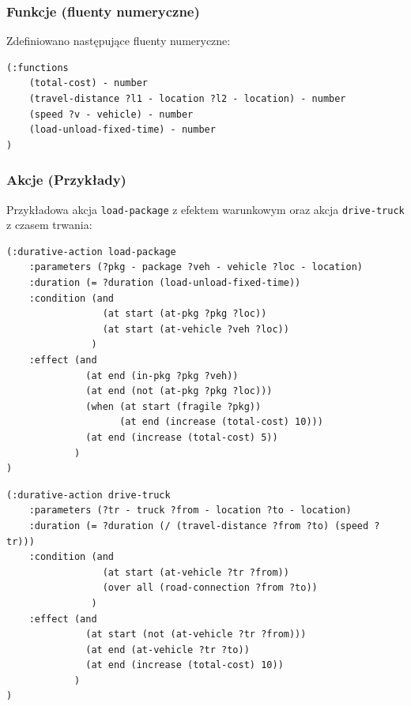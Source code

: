 \documentclass[11pt,a4paper]{article}
\begin{document}
\subsubsection{Funkcje (fluenty numeryczne)}
Zdefiniowano następujące fluenty numeryczne:
\begin{lstlisting}[caption=Funkcje w domenie Zadania 1, label=lst:func_task1]
(:functions
    (total-cost) - number
    (travel-distance ?l1 - location ?l2 - location) - number
    (speed ?v - vehicle) - number
    (load-unload-fixed-time) - number
)
\end{lstlisting}

\subsubsection{Akcje (Przykłady)}
Przykładowa akcja \texttt{load-package} z efektem warunkowym oraz akcja \texttt{drive-truck} z czasem trwania:
\begin{lstlisting}[caption=Akcja load-package z efektem warunkowym, label=lst:action_load_task1]
(:durative-action load-package
    :parameters (?pkg - package ?veh - vehicle ?loc - location)
    :duration (= ?duration (load-unload-fixed-time))
    :condition (and
                 (at start (at-pkg ?pkg ?loc))
                 (at start (at-vehicle ?veh ?loc))
               )
    :effect (and
              (at end (in-pkg ?pkg ?veh))
              (at end (not (at-pkg ?pkg ?loc)))
              (when (at start (fragile ?pkg))
                    (at end (increase (total-cost) 10))) 
              (at end (increase (total-cost) 5))
            )
)
\end{lstlisting}
\begin{lstlisting}[caption=Akcja drive-truck z czasem trwania, label=lst:action_drive_task1]
(:durative-action drive-truck
    :parameters (?tr - truck ?from - location ?to - location)
    :duration (= ?duration (/ (travel-distance ?from ?to) (speed ?tr)))
    :condition (and
                 (at start (at-vehicle ?tr ?from))
                 (over all (road-connection ?from ?to))
               )
    :effect (and
              (at start (not (at-vehicle ?tr ?from)))
              (at end (at-vehicle ?tr ?to))
              (at end (increase (total-cost) 10))
            )
)
\end{lstlisting}
\end{document}
